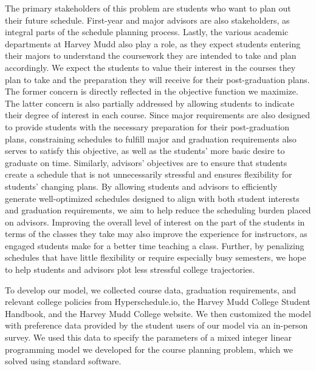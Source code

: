 \documentclass[12pt]{article}
\begin{document}
The primary stakeholders of this problem are students who want to plan out their future schedule.
First-year and major advisors are also stakeholders, as integral parts of the schedule planning process.
Lastly, the various academic departments at Harvey Mudd also play a role, as they expect students entering their majors to understand the coursework they are intended to take and plan accordingly.
We expect the students to value their interest in the courses they plan to take and the preparation they will receive for their post-graduation plans.
The former concern is directly reflected in the objective function we maximize.
The latter concern is also partially addressed by allowing students to indicate their degree of interest in each course.
Since major requirements are also designed to provide students with the necessary preparation for their post-graduation plans, constraining schedules to fulfill major and graduation requirements also serves to satisfy this objective, as well as the students' more basic desire to graduate on time.
Similarly, advisors' objectives are to ensure that students create a schedule that is not unnecessarily stressful and ensures flexibility for students' changing plans.
By allowing students and advisors to efficiently generate well-optimized schedules designed to align with both student interests and graduation requirements, we aim to help reduce the scheduling burden placed on advisors.
Improving the overall level of interest on the part of the students in terms of the classes they take may also improve the experience for instructors, as engaged students make for a better time teaching a class.
Further, by penalizing schedules that have little flexibility or require especially busy semesters, we hope to help students and advisors plot less stressful college trajectories.

To develop our model, we collected course data, graduation requirements, and relevant college policies from Hyperschedule.io, the Harvey Mudd College Student Handbook, and the Harvey Mudd College website.
We then customized the model with preference data provided by the student users of our model via an in-person survey.
We used this data to specify the parameters of a mixed integer linear programming model we developed for the course planning problem, which we solved using standard software.
\end{document}
